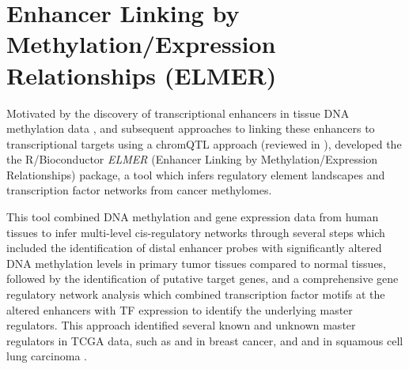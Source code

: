 
\section{Enhancer Linking by Methylation/Expression Relationships (ELMER)}

Motivated by the discovery of transcriptional enhancers in tissue DNA methylation data \cite{berman2012ng}, and subsequent approaches to linking these enhancers to transcriptional targets using a chromQTL approach \cite{aran2013dna} (reviewed in ),  developed the the R/Bioconductor  \textit{ELMER} (Enhancer Linking by Methylation/Expression Relationships) package, a tool which infers regulatory element landscapes and transcription factor networks from cancer methylomes.

This tool combined DNA methylation and gene expression data from human tissues to infer multi-level cis-regulatory networks through several steps which included the identification of distal enhancer probes with significantly altered DNA methylation levels in primary tumor tissues compared to normal tissues, followed by the identification of putative target genes, and a comprehensive gene regulatory network analysis which combined transcription factor motifs at the altered enhancers with TF expression to identify the underlying master regulators. This approach identified several known and unknown master regulators in TCGA data, such as  and  in breast cancer, and  and  in squamous cell lung carcinoma \cite{yao2015inferring,silva2016tcga}.

